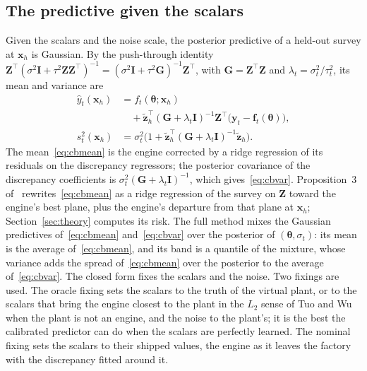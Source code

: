 \begin{table}[!t]
\caption{The eight fitted scalars of the engine on the HP500 lane, with their shipped value (the prior centre), the prior
standard deviation on the sampled scale, and the posterior mean of the fit to all ten surveys, which is the truth of the
virtual plants of Section~\ref{sec:design}.}
\label{tab:scalars}
\centering\footnotesize
\resizebox{\columnwidth}{!}{}
\end{table}

\subsection{The predictive given the scalars}

Given the scalars and the noise scale, the posterior predictive of a held-out survey at $\mathbf x_h$ is Gaussian. By the
push-through identity $\mathbf Z^{\top}(\sigma^2\mathbf I+\tau^2\mathbf Z\mathbf Z^{\top})^{-1}=(\sigma^2\mathbf I+\tau^2\mathbf
G)^{-1}\mathbf Z^{\top}$, with $\mathbf G=\mathbf Z^{\top}\mathbf Z$ and $\lambda_t=\sigma_t^2/\tau_t^2$, its mean and variance are
\begin{align}
\hat y_{t}(\mathbf x_h)&=f_t(\boldsymbol\theta;\mathbf x_h)\nonumber\\
&\quad+\tilde{\mathbf z}_h^{\top}(\mathbf G+\lambda_t\mathbf I)^{-1}\mathbf Z^{\top}\big(\mathbf y_t-\mathbf f_t(\boldsymbol\theta)\big),\label{eq:cbmean}\\
s_t^2(\mathbf x_h)&=\sigma_t^2\Big(1+\tilde{\mathbf z}_h^{\top}(\mathbf G+\lambda_t\mathbf I)^{-1}\tilde{\mathbf z}_h\Big).\label{eq:cbvar}
\end{align}
The mean~\eqref{eq:cbmean} is the engine corrected by a ridge regression of its residuals on the discrepancy regressors; the
posterior covariance of the discrepancy coefficients is $\sigma_t^2(\mathbf G+\lambda_t\mathbf I)^{-1}$, which
gives~\eqref{eq:cbvar}. Proposition~3 of~\cite{cb002} rewrites~\eqref{eq:cbmean} as a ridge regression of the survey on
$\mathbf Z$ toward the engine's best plane, plus the engine's departure from that plane at $\mathbf x_h$; Section~\ref{sec:theory}
computes its risk. The full method mixes the Gaussian predictives of~\eqref{eq:cbmean} and~\eqref{eq:cbvar} over the
posterior of $(\boldsymbol\theta,\sigma_t)$: its mean is the average of~\eqref{eq:cbmean}, and its band is a quantile of the
mixture, whose variance adds the spread of~\eqref{eq:cbmean} over the posterior to the average of~\eqref{eq:cbvar}. The closed
form fixes the scalars and the noise. Two fixings are used. The oracle fixing sets the scalars to the
truth of the virtual plant, or to the scalars that bring the engine closest to the plant in the $L_2$ sense of Tuo and
Wu~\cite{tuowu} when the plant is not an engine, and the noise to the plant's; it is the best the calibrated predictor can do
when the scalars are perfectly learned. The nominal fixing sets the scalars to their shipped values, the engine as it leaves
the factory with the discrepancy fitted around it.

